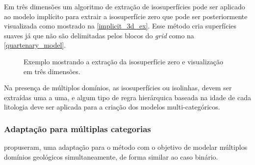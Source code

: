 Em três dimensões um algoritmo de extração de isosuperfícies pode ser aplicado ao modelo implícito para extrair a isosuperfície zero que pode ser posteriormente visualizada como mostrado na \autoref{implicit_3d_ex}. Esse método cria superfícies suaves já que não são delimitadas pelos blocos do \textit{grid} como na \autoref{quartenary_model}. 

\begin{figure}[H]
    \caption{Exemplo mostrando a extração da isosuperfície zero e visualização em três dimensões.} \label{implicit_3d_ex}
     \centering
     \hspace{1em}
\end{figure}

Na presença de múltiplos domínios, as isosuperfícies ou isolinhas, devem ser extraídas uma a uma, e algum tipo de regra hierárquica baseada na idade de cada litologia deve ser aplicada para a criação dos modelos multi-categóricos.

\subsubsection{Adaptação para múltiplas categorias}

 propuseram, uma adaptação para o método com o objetivo de modelar múltiplos domínios geológicos simultaneamente, de forma similar ao caso binário.

